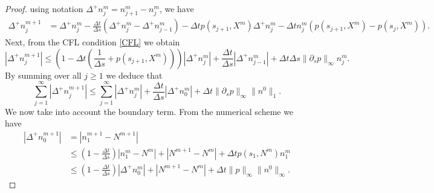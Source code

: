 \documentclass[10pt,a4paper]{amsart}
\begin{document}
\begin{proof}
using notation $\Delta^{+}n_j^m=n_{j+1}^{m}-n_{j}^{m}$, we have
\begin{equation*}
    \begin{split}
      \Delta^{+}n_j^{m+1}&=  \Delta^{+}n_j^{m}-\frac{\Delta t}{\Delta s}\left(\Delta^{+}n_j^{m}-\Delta^{+}n_{j-1}^{m}\right)-\Delta t p(s_{j+1},X^m)\Delta^{+}n_j^{m}
       -\Delta t n_j^m(p(s_{j+1},X^m)-p(s_{j},X^m)).
    \end{split}
\end{equation*}
Next, from the CFL condition \eqref{CFL} we obtain
\begin{equation*}
     |\Delta^{+}n_j^{m+1}| \le \left(1-\Delta t\left( \frac{1}{\Delta s}+p(s_{j+1},X^m) \right) \right)|\Delta^{+}n_j^{m}|
     +\frac{\Delta t}{\Delta s}|\Delta^{+}n_{j-1}^{m}|+\Delta t\Delta s\|\partial_s p\|_\infty n_j^m.
\end{equation*}
By summing over all $j\ge 1$ we deduce that
\begin{equation}
\label{Delta+nm}
\sum_{j=1}^\infty|\Delta^{+}n_j^{m+1}|\le
\sum_{j=1}^\infty|\Delta^{+}n_j^{m}|
+ \frac{\Delta t}{\Delta s} |\Delta^{+}n_{0}^{m}|+\Delta t\|\partial_s p\|_\infty\|n^0\|_1. 
\end{equation}
We now take into account the boundary term. From the numerical scheme we have
\begin{equation*}
\label{Delta+n0-d}
\begin{split}
     |\Delta^{+}n_0^{m+1}| & = |n_1^{m+1}-N^{m+1}|\\
     & \le \left(1-\frac{\Delta t}{\Delta s}\right)|n_1^m-N^m|+  |N^{m+1}- N^m|+\Delta t p(s_1,N^m) n^m_1\\
     &\le \left(1-\frac{\Delta t}{\Delta s}\right)|\Delta^+ n_0^m|+  |N^{m+1}-N^m|+\Delta t \|p\|_\infty \|n^0\|_\infty.
\end{split} 
\end{equation*}


\end{proof}
\end{document}
